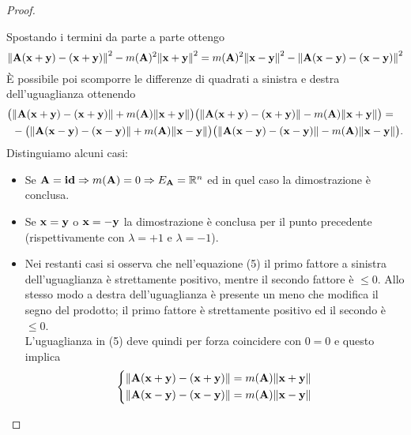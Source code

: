\documentclass[a4paper,11pt,openright,twoside	]{book}
\begin{document}
\begin{proof}
\begin{itemize}
Spostando i termini da parte a parte ottengo
\[ \norm{\vb{A(x+y) - (x+y)}}^2 - m(\vb{A})^2 \norm{\vb{x+y}}^2=  m(\vb{A})^2 \norm{\vb{x-y}}^2 - \norm{\vb{A(x-y) - (x-y)}}^2 \]
\`E possibile poi scomporre le differenze di quadrati a sinistra e destra dell'uguaglianza ottenendo
\begin{equation} 
\begin{split}
\big( & \norm{\vb{A(x+y) - (x+y)}}  + m(\vb{A})\norm{\vb{x+y}} \big) \big( \norm{\vb{A(x+y) - (x+y)}} - m(\vb{A}) \norm{\vb{x+y}} \big) = \\
& -\big( \norm{\vb{A(x-y) - (x-y)}} + m(\vb{A})\norm{\vb{x-y}} \big) \big( \norm{\vb{A(x-y) - (x-y)}} - m(\vb{A}) \norm{\vb{x-y}} \big).
\end{split}
\end{equation}
Distinguiamo alcuni casi: 
\begin{itemize}
\item Se $\vb{A} = \vb{id} \Rightarrow m(\vb{A}) = 0 \Rightarrow E_{\vb{A}} = \mathbb{R}^{n}$  ed in quel caso la dimostrazione è conclusa.
\item Se $\vb{x} = \vb{y}$ o $\vb{x} = \vb{-y}$  la dimostrazione è conclusa per il punto precedente (rispettivamente con $\lambda = +1$ e $\lambda = -1$). 
\item Nei restanti casi si osserva che nell'equazione (5) il primo fattore a sinistra dell'uguaglianza è strettamente positivo, mentre il secondo fattore è $\leq 0 $. Allo stesso modo a destra dell'uguaglianza è presente un meno che modifica il segno del prodotto; il primo fattore è strettamente positivo ed il secondo è $\leq 0 $. \\ L'uguaglianza in (5) deve quindi per forza coincidere con $0=0$ e questo implica 
\begin{equation*}
  \left\{
    \begin{aligned}
      & \norm{\vb{A(x+y) - (x+y)}} = m(\vb{A})\norm{\vb{x+y}} \\
      & \norm{\vb{A(x-y) - (x-y)}} = m(\vb{A})\norm{\vb{x-y}} 
    \end{aligned}
  \right.
\end{equation*}


\end{itemize}
\end{itemize}
\end{proof}
\end{document}
